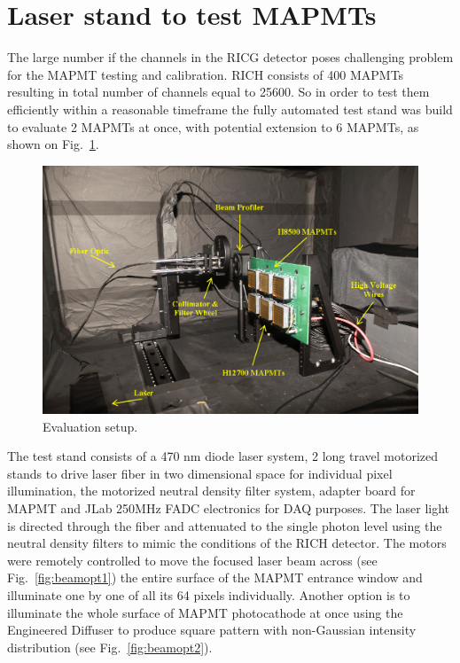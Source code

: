
\section{Laser stand to test MAPMTs}
The large number if the channels in the RICG detector  poses challenging problem for the MAPMT testing and calibration.
RICH consists of 400 MAPMTs resulting in total number of channels equal to 25600. So in order to test them efficiently within a reasonable timeframe the fully automated test stand was build to evaluate 2 MAPMTs at once, with potential extension to 6 MAPMTs, as shown on Fig.~\ref{fig:MAPMTtest}.

\begin{figure}[hbt]
	\centering
	\includegraphics[width=0.9\linewidth]{blackbox.png}
	\caption{Evaluation setup.}
	\label{fig:MAPMTtest}
\end{figure}

The test stand consists of a 470 nm diode laser system, 2 long travel motorized stands to drive laser fiber in two dimensional space for individual pixel illumination, the motorized neutral density filter system, adapter board for MAPMT and JLab 250MHz FADC electronics for DAQ purposes.
The laser light is directed through the fiber and attenuated to the single photon level using the neutral density filters to mimic the conditions of the RICH detector.
The motors were remotely controlled to move the focused laser beam across (see Fig.~\ref{fig:beamopt1}) the entire surface of the MAPMT entrance window and illuminate one by one of all its 64 pixels individually.
Another option is to illuminate the whole surface of MAPMT photocathode at once using the Engineered Diffuser to produce square pattern with non-Gaussian intensity distribution (see Fig.~\ref{fig:beamopt2}).

